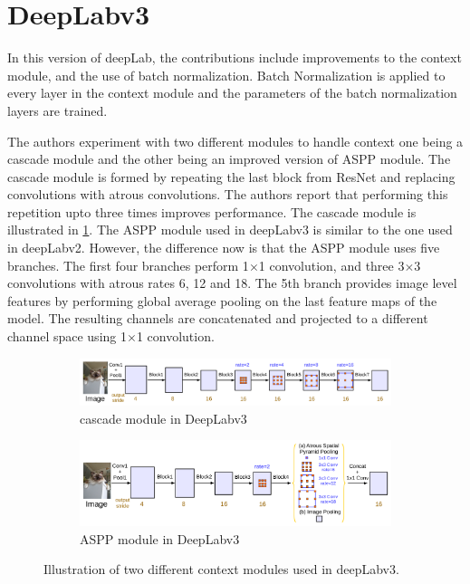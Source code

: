 \section{DeepLabv3}
In this version of deepLab, the contributions include improvements to the context module, and the use of batch normalization. Batch Normalization is applied to every layer in the context module and the parameters of the batch normalization layers are trained.

The authors experiment with two different modules to handle context one being a cascade module and the other being an improved version of ASPP module. The cascade module is formed by repeating the last block from ResNet and replacing convolutions with atrous convolutions. The authors report that performing this repetition upto three times improves performance. 	The cascade module is illustrated in \ref{Fig:contextmodulea}. The ASPP module used in deepLabv3 is similar to the one used in deepLabv2. However, the difference now is that the ASPP module uses five branches. The first four branches perform 1$\times$1 convolution, and three 3$\times$3 convolutions with atrous rates 6, 12 and 18. The 5th branch provides image level features by performing global average pooling on the last feature maps of the model. The resulting channels are concatenated and projected to a different channel space using 1$\times$1 convolution.

	\begin{figure}[!htb]
		\begin{subfigure}{1\textwidth}
			\centering
			\includegraphics[width=1\linewidth]{images/cascade_module}
			\caption{cascade module in DeepLabv3}
			\label{Fig:contextmodulea}
		\end{subfigure}
		\begin{subfigure}{1\textwidth}
			\centering
			\includegraphics[width=1\linewidth]{images/aspp_module}
			\caption{ASPP module in DeepLabv3}
			\label{Fig:contextmoduleb}
		\end{subfigure}
		\caption{Illustration of two different context modules used in deepLabv3.}
		\label{Fig:contextmodule}
	\end{figure}

